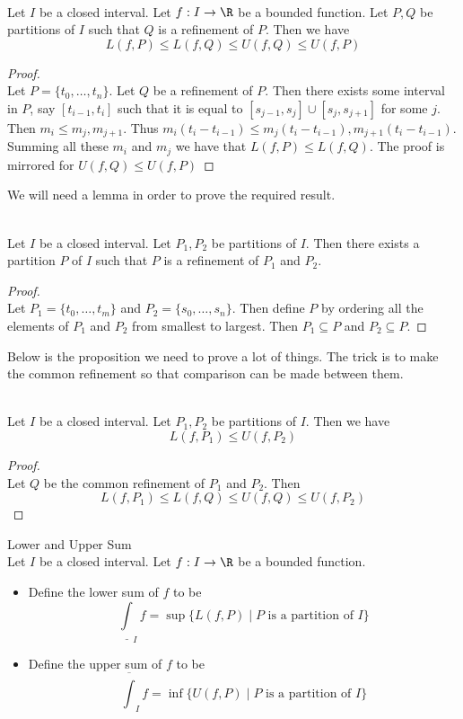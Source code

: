 \documentclass[a4paper]{article}
\begin{document}
\begin{prp}{}{}\\
Let $I$ be a closed interval. Let $f:I\to\R$ be a bounded function. Let $P,Q$ be partitions of $I$ such that $Q$ is a refinement of $P$. Then we have $$L(f,P)\leq L(f,Q)\leq U(f,Q)\leq U(f,P)$$ 
\begin{proof}\\ Let $P=\{t_0,\dots,t_n\}$. Let $Q$ be a refinement of $P$. Then there exists some interval in $P$, say $[t_{i-1},t_i]$ such that it is equal to $[s_{j-1},s_j]\cup[s_j,s_{j+1}]$ for some $j$. Then $m_i\leq m_j,m_{j+1}$. Thus $m_i(t_i-t_{i-1})\leq m_j(t_i-t_{i-1}),m_{j+1}(t_i-t_{i-1})$. Summing all these $m_i$ and $m_j$ we have that $L(f,P)\leq L(f,Q)$. The proof is mirrored for $U(f,Q)\leq U(f,P)$
\end{proof}
\end{prp}

We will need a lemma in order to prove the required result. 

\begin{lmm}{}{}\\
Let $I$ be a closed interval. Let $P_1,P_2$ be partitions of $I$. Then there exists a partition $P$ of $I$ such that $P$ is a refinement of $P_1$ and $P_2$. 
\begin{proof}\\ Let $P_1=\{t_0,\dots,t_m\}$ and $P_2=\{s_0,\dots,s_n\}$. Then define $P$ by ordering all the elements of $P_1$ and $P_2$ from smallest to largest. Then $P_1\subseteq P$ and $P_2\subseteq P$. 
\end{proof}
\end{lmm}

Below is the proposition we need to prove a lot of things. The trick is to make the common refinement so that comparison can be made between them. 

\begin{prp}{}{}\\
Let $I$ be a closed interval. Let $P_1,P_2$ be partitions of $I$. Then we have $$L(f,P_1)\leq U(f,P_2)$$ 
\begin{proof}\\ Let $Q$ be the common refinement of $P_1$ and $P_2$. Then $$L(f,P_1)\leq L(f,Q)\leq U(f,Q)\leq U(f,P_2)$$
\end{proof}
\end{prp}

\begin{defn}{Lower and Upper Sum}{}\\
Let $I$ be a closed interval. Let $f:I\to\R$ be a bounded function. 
\begin{itemize}
\item Define the lower sum of $f$ to be $$\underline{\int}_If=\sup\{L(f,P)\;|\;P\text{ is a partition of }I\}$$
\item Define the upper sum of $f$ to be $$\overline{\int}_If=\inf\{U(f,P)\;|\;P\text{ is a partition of }I\}$$
\end{itemize}
\end{defn}
\end{document}
